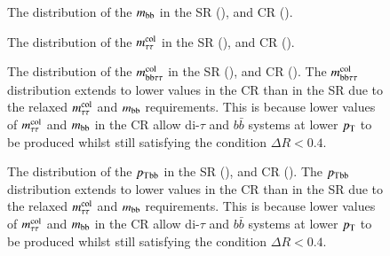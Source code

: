    \begin{figure}[htbp]
        \centering
        \caption{
            The distribution of the $m_\mathrm{bb}$ in the SR (\protect{}), and CR (\protect{}).
        }
        \label{fig:2p_mbb}
    \end{figure}

    \begin{figure}[htbp]
        
        \centering
        \caption{
            The distribution of the $m_\mathrm{\tau\tau}^\mathrm{col}$ in the SR (\protect{}), and CR (\protect{}).
        }
        \label{fig:2p_mtt}
    \end{figure}   

    \begin{figure}[htbp]
        \centering
        \caption{
            The distribution of the $m_\mathrm{bb\tau\tau}^\mathrm{col}$ in the SR (\protect{}), and CR (\protect{}).
            The $m_\mathrm{bb\tau\tau}^\mathrm{col}$ distribution extends to lower values in the CR than in the SR due to the relaxed $m_\mathrm{\tau\tau}^\mathrm{col}$ and $m_\mathrm{bb}$ requirements.  
            This is because lower values of $m_\mathrm{\tau\tau}^\mathrm{col}$ and $m_\mathrm{bb}$ in the CR allow di-$\tau$ and $b\bar{b}$ systems at 
            lower $p_{\text{T}}$ to be produced whilst still satisfying the condition $\Delta{R} < 0.4$.
        }
        \label{fig:2p_mbbtt}
    \end{figure}
    \begin{figure}[htbp]
        
        \centering
        \caption{
            The distribution of the $p_{\text{T}}{}_\mathrm{bb}$ in the SR (\protect{}), and CR (\protect{}).
            The $p_{\text{T}}{}_\mathrm{bb}$ distribution extends to lower values in the CR than in the SR due to the relaxed $m_\mathrm{\tau\tau}^\mathrm{col}$ and $m_\mathrm{bb}$ requirements.  
            This is because lower values of $m_\mathrm{\tau\tau}^\mathrm{col}$ and $m_\mathrm{bb}$ in the CR allow di-$\tau$ and $b\bar{b}$ systems at 
            lower $p_{\text{T}}$ to be produced whilst still satisfying the condition $\Delta{R} < 0.4$.
        }
        \label{fig:2p_pTbb}
    \end{figure}

